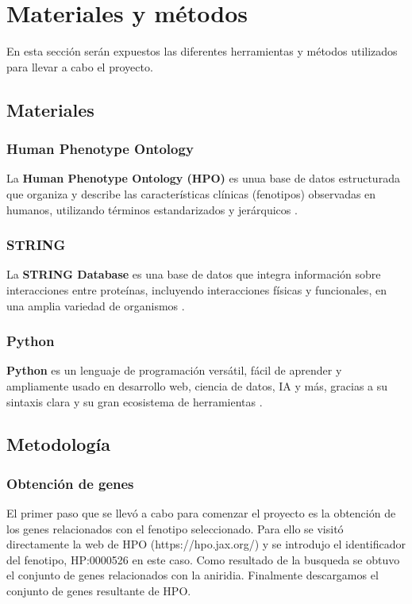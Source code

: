 \section{Materiales y métodos}

En esta sección serán expuestos las diferentes herramientas y métodos utilizados para llevar a cabo el proyecto.

\subsection{\textbf{Materiales}}
\subsubsection{Human Phenotype Ontology}

La \textbf{Human Phenotype Ontology (HPO)} es unua base de datos estructurada que organiza y describe las características clínicas (fenotipos) observadas en humanos, utilizando términos estandarizados y jerárquicos \cite{Gargano2024}.

\subsubsection{STRING}

La \textbf{STRING Database} es una base de datos que integra información sobre interacciones entre proteínas, incluyendo interacciones físicas y funcionales, en una amplia variedad de organismos \cite{STRING2024}.

\subsubsection{Python}

\textbf{Python} es un lenguaje de programación versátil, fácil de aprender y ampliamente usado en desarrollo web, ciencia de datos, IA y más, gracias a su sintaxis clara y su gran ecosistema de herramientas \cite{Python2024}.


\subsection{\textbf{Metodología}}

\subsubsection{Obtención de genes}

El primer paso que se llevó a cabo para comenzar el proyecto es la obtención de los genes relacionados con el fenotipo seleccionado. Para ello se visitó directamente la web de HPO (https://hpo.jax.org/) y se introdujo el identificador del fenotipo, HP:0000526 en este caso. Como resultado de la busqueda se obtuvo el conjunto de genes relacionados con la aniridia. Finalmente descargamos el conjunto de genes resultante de HPO.  


